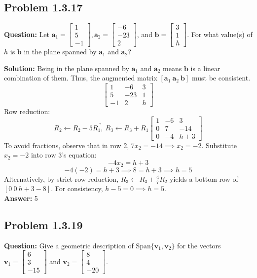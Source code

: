 \documentclass[11pt]{article}
\begin{document}
\subsection*{Problem 1.3.17}
\textbf{Question:} Let $\mathbf{a}_1 = \begin{bmatrix} 1 \\ 5 \\ -1 \end{bmatrix}, \mathbf{a}_2 = \begin{bmatrix} -6 \\ -23 \\ 2 \end{bmatrix}$, and $\mathbf{b} = \begin{bmatrix} 3 \\ 1 \\ h \end{bmatrix}$. For what value(s) of $h$ is $\mathbf{b}$ in the plane spanned by $\mathbf{a}_1$ and $\mathbf{a}_2$?

\textbf{Solution:}
Being in the plane spanned by $\mathbf{a}_1$ and $\mathbf{a}_2$ means $\mathbf{b}$ is a linear combination of them. Thus, the augmented matrix $[\mathbf{a}_1 \ \mathbf{a}_2 \ \mathbf{b}]$ must be consistent.
\[ \begin{bmatrix} 1 & -6 & 3 \\ 5 & -23 & 1 \\ -1 & 2 & h \end{bmatrix} \]
Row reduction:
\[ \underrightarrow{R_2 \leftarrow R_2 - 5R_1, \ R_3 \leftarrow R_3 + R_1} \begin{bmatrix} 1 & -6 & 3 \\ 0 & 7 & -14 \\ 0 & -4 & h+3 \end{bmatrix} \]
To avoid fractions, observe that in row 2, $7x_2 = -14 \implies x_2 = -2$.
Substitute $x_2 = -2$ into row 3's equation:
\[ -4x_2 = h + 3 \]
\[ -4(-2) = h + 3 \implies 8 = h + 3 \implies h = 5 \]
Alternatively, by strict row reduction, $R_3 \leftarrow R_3 + \frac{4}{7}R_2$ yields a bottom row of $[0 \ 0 \ h+3-8]$. For consistency, $h - 5 = 0 \implies h = 5$.
\\
\textbf{Answer:} 5


\subsection*{Problem 1.3.19}
\textbf{Question:} Give a geometric description of $\text{Span}\{\mathbf{v}_1, \mathbf{v}_2\}$ for the vectors $\mathbf{v}_1 = \begin{bmatrix} 6 \\ 3 \\ -15 \end{bmatrix}$ and $\mathbf{v}_2 = \begin{bmatrix} 8 \\ 4 \\ -20 \end{bmatrix}$.
\end{document}
